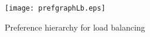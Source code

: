 \begin{figure}[hbt!]
    \centering
    \texttt{[image: prefgraphLb.eps]}
    \caption{Preference hierarchy for load balancing}
    \label{fig:prefgraphLb}
\end{figure}
